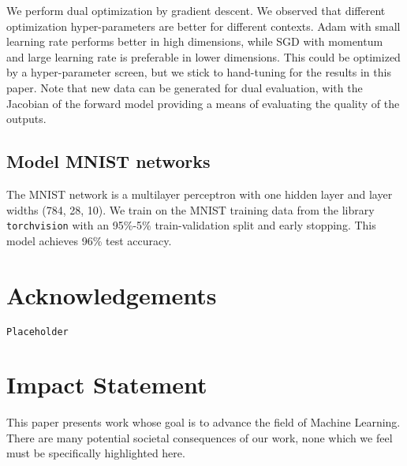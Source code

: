 \documentclass{article}      %
\begin{document}
We perform dual optimization by gradient descent. We observed that different optimization hyper-parameters are better for different contexts.
Adam with small learning rate performs better in high dimensions, while SGD with momentum and large learning rate is preferable in lower dimensions.
This could be optimized by a hyper-parameter screen, but we stick to hand-tuning for the results in this paper.
Note that new data can be generated for dual evaluation, with the Jacobian of the forward model providing a means of evaluating the quality of the outputs.




\subsection{Model MNIST networks} \label{sec:model_network_details}

The MNIST network is a multilayer perceptron with one hidden layer and layer widths (784, 28, 10).
We train on the MNIST training data from the library \texttt{torchvision} with an 95\%-5\% train-validation split and early stopping.
This model achieves 96\% test accuracy.








\section*{Acknowledgements}

\texttt{Placeholder}

\section*{Impact Statement}
This paper presents work whose goal is to advance the field of 
Machine Learning. There are many potential societal consequences 
of our work, none which we feel must be specifically highlighted here.






\end{document}
